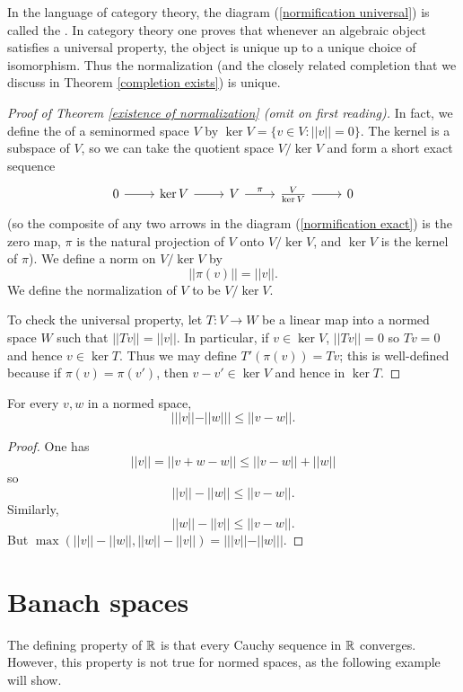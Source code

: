 \begin{subsec}
In the language of category theory, the diagram (\ref{normification universal}) is called the .
In category theory one proves that whenever an algebraic object satisfies a universal property, the object is unique up to a unique choice of isomorphism.
Thus the normalization (and the closely related completion that we discuss in Theorem \ref{completion exists}) is unique.
\end{subsec}

\begin{proof}[Proof of Theorem \ref{existence of normalization} (omit on first reading)]
In fact, we define the  of a seminormed space $V$ by $\ker V = \{v \in V: ||v|| = 0\}$.
The kernel is a subspace of $V$, so we can take the quotient space $V/\ker V$ and form a short exact sequence
\begin{equation}
\label{normification exact}
\begin{tikzcd}
0 \arrow[r] & \ker V \arrow[r] & V \arrow[r,"\pi"] & \frac{V}{\ker V} \arrow[r] & 0
\end{tikzcd}
\end{equation}
(so the composite of any two arrows in the diagram (\ref{normification exact}) is the zero map, $\pi$ is the natural projection of $V$ onto $V/\ker V$, and $\ker V$ is the kernel of $\pi$).
We define a norm on $V/\ker V$ by
$$||\pi(v)|| = ||v||.$$
We define the normalization of $V$ to be $V/\ker V$.

To check the universal property, let $T: V \to W$ be a linear map into a normed space $W$ such that $||Tv|| = ||v||$.
In particular, if $v \in \ker V$, $||Tv|| = 0$ so $Tv = 0$ and hence $v \in \ker T$.
Thus we may define $T'(\pi(v)) = Tv$; this is well-defined because if $\pi(v) = \pi(v')$, then $v - v' \in \ker V$ and hence in $\ker T$.
\end{proof}

\begin{lemma}
For every $v, w$ in a normed space,
$$|||v|| - ||w||| \leq ||v - w||.$$
\end{lemma}
\begin{proof}
One has
$$||v|| = ||v + w - w|| \leq ||v - w|| + ||w||$$
so
$$||v|| - ||w|| \leq ||v - w||.$$
Similarly,
$$||w|| - ||v|| \leq ||v - w||.$$
But $\max(||v|| - ||w||, ||w|| - ||v||) = |||v|| - ||w|||$.
\end{proof}

\section{Banach spaces}
\label{Banach space appendix}
The defining property of $\mathbb{R}$ is that every Cauchy sequence in $\mathbb{R}$ converges.
However, this property is not true for normed spaces, as the following example will show.

